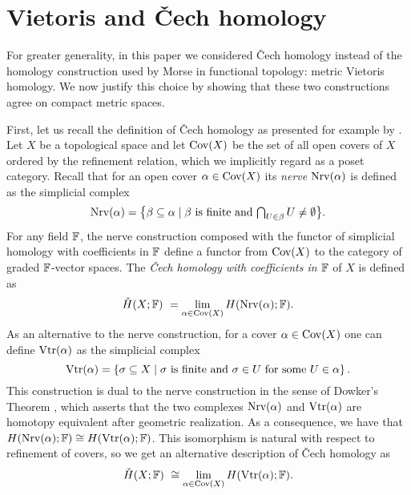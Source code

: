
\section{Vietoris and \texorpdfstring{\v{C}}{}ech homology} \label{s:vietoris}

For greater generality, in this paper we considered \v{C}ech homology instead of the homology construction used by Morse in functional topology: metric Vietoris homology.
We now justify this choice by showing that these two constructions agree on compact metric spaces.

First, let us recall the definition of \v{C}ech homology as presented for example by \cite[Section~IX--X]{Eilenberg.1952}.
Let $X$ be a topological space and let $\operatorname{Cov}(X)$ be the set of all open covers of $X$ ordered by the refinement relation, which we implicitly regard as a poset category.
Recall that for an open cover $\alpha \in \operatorname{Cov}(X)$ its \emph{nerve} $\operatorname{Nrv}(\alpha)$ is defined as the simplicial complex
\begin{equation*}
\operatorname{Nrv}(\alpha) =
\big\{ \beta \subseteq \alpha \mid \beta \text{ is finite and } \textstyle{\bigcap_{U \in \beta}} \, U \neq \emptyset \big\}.
\end{equation*}
For any field $\mathbb{F}$, the nerve construction composed with the functor of simplicial homology with coefficients in $\mathbb{F}$ define a functor from $\operatorname{Cov}(X)$ to the category of graded $\mathbb{F}$-vector spaces.
The \emph{\v{C}ech homology with coefficients in $\mathbb{F}$} of $X$ is defined as
\begin{equation*}
\check{H}(X; \mathbb{F}) \ =
\lim_{\alpha \in \operatorname{Cov}(X)} H(\operatorname{Nrv}(\alpha); \mathbb{F}).
\end{equation*}
As an alternative to the nerve construction, for a cover $\alpha \in \operatorname{Cov}(X)$ one can define $\operatorname{Vtr}(\alpha)$ as the simplicial complex
\begin{equation*}
\operatorname{Vtr} (\alpha) = \left\{ \sigma \subseteq X \mid \sigma \text{ is finite and } \sigma \in U \text{ for some } U \in \alpha \right\}.
\end{equation*}
This construction is dual to the nerve construction in the sense of Dowker's Theorem \cite{Dowker.1952}, which asserts that the two complexes $\operatorname{Nrv} (\alpha)$ and $\operatorname{Vtr} (\alpha)$ are homotopy equivalent after geometric realization.
As a consequence, we have that $H (\operatorname{Nrv} (\alpha); \mathbb{F}) \cong H (\operatorname{Vtr} (\alpha); \mathbb{F})$.
This isomorphism is natural with respect to refinement of covers, so we get an alternative description of \v{C}ech homology as
\begin{equation*}
\check{H} (X; \mathbb{F}) \ \cong
\lim_{\alpha \in \operatorname{Cov} (X)} H (\operatorname{Vtr} (\alpha); \mathbb{F}).
\end{equation*}

